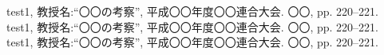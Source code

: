 \makeatletter
\def\@biblabel#1{(#1)}
\makeatother

\renewcommand{\bibname}{研究業績}
\begin{thebibliography}{99}
\setcounter{enumiv}{100}
\setlength{\labelsep}{1.0mm}
 test1, 教授名:“〇〇の考察”, 平成〇〇年度〇〇連合大会. 〇〇, pp. 220–221.
 test1, 教授名:“〇〇の考察”, 平成〇〇年度〇〇連合大会. 〇〇, pp. 220–221.
 test1, 教授名:“〇〇の考察”, 平成〇〇年度〇〇連合大会. 〇〇, pp. 220–221.
\end{thebibliography}